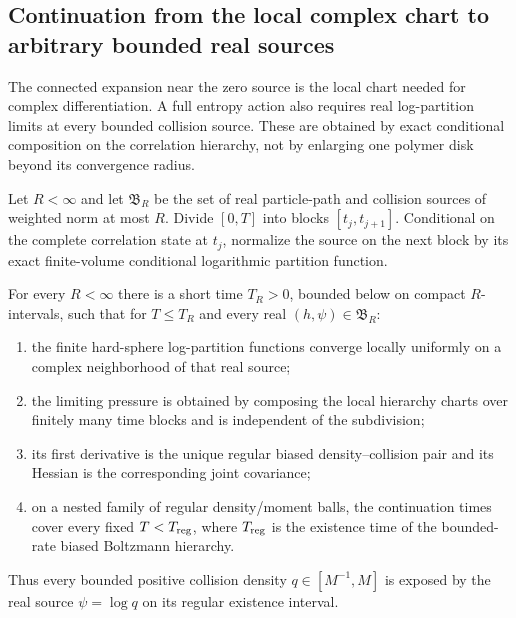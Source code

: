 \subsection{Continuation from the local complex chart to arbitrary bounded real sources}

The connected expansion near the zero source is the local chart needed for
complex differentiation.  A full entropy action also requires real
log-partition limits at every bounded collision source.  These are obtained by
exact conditional composition on the correlation hierarchy, not by enlarging
one polymer disk beyond its convergence radius.

Let \(R<\infty\) and let \(\mathfrak B_R\) be the set of real particle-path
and collision sources of weighted norm at most \(R\).  Divide \([0,T]\) into
blocks \([t_j,t_{j+1}]\).  Conditional on the complete correlation state at
\(t_j\), normalize the source on the next block by its exact finite-volume
conditional logarithmic partition function.

\begin{theorem}
\label{thm:r3-b2-source-continuation}
For every \(R<\infty\) there is a short time
\(T_R>0\), bounded below on compact \(R\)-intervals, such that for
\(T\le T_R\) and every real \((h,\psi)\in\mathfrak B_R\):
\begin{enumerate}[label=(\roman*)]
\item the finite hard-sphere log-partition functions converge locally
      uniformly on a complex neighborhood of that real source;
\item the limiting pressure is obtained by composing the local hierarchy
      charts over finitely many time blocks and is independent of the
      subdivision;
\item its first derivative is the unique regular biased density--collision
      pair and its Hessian is the corresponding joint covariance;
\item on a nested family of regular density/moment balls, the continuation
      times cover every fixed \(T<T_{\rm reg}\), where \(T_{\rm reg}\) is the
      existence time of the bounded-rate biased Boltzmann hierarchy.
\end{enumerate}
Thus every bounded positive collision density
\(q\in[M^{-1},M]\) is exposed by the real source \(\psi=\log q\) on its
regular existence interval.
\end{theorem}

